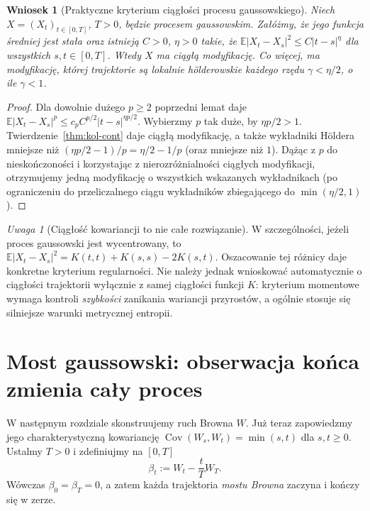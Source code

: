 \documentclass[11pt,a4paper,oneside]{report}
\numberwithin{equation}{chapter}
\theoremstyle{plain}
\newtheorem{wniosek}[twierdzenie]{Wniosek}
\theoremstyle{definition}
\theoremstyle{remark}
\newtheorem{uwaga}{Uwaga}[chapter]
\newcommand{\E}{\mathbb{E}}
\newcommand{\Cov}{\operatorname{Cov}}
\begin{document}
\begin{wniosek}[Praktyczne kryterium ciągłości procesu gaussowskiego]
Niech $X=(X_t)_{t\in[0,T]}$, $T>0$, będzie procesem gaussowskim.
Załóżmy, że jego funkcja średniej jest stała oraz istnieją
$C>0$, $\eta>0$ takie, że
$\E|X_t-X_s|^2\le C|t-s|^{\eta}$ dla wszystkich $s,t\in[0,T]$.
Wtedy $X$ ma ciągłą modyfikację. Co więcej, ma modyfikację,
której trajektorie są lokalnie h\"olderowskie każdego rzędu
$\gamma<\eta/2$, o ile $\gamma<1$.
\end{wniosek}
\begin{proof}
Dla dowolnie dużego $p\ge2$ poprzedni lemat daje
$\E|X_t-X_s|^p\le c_p C^{p/2}|t-s|^{\eta p/2}$.
Wybierzmy $p$ tak duże, by $\eta p/2>1$.
Twierdzenie~\ref{thm:kol-cont} daje ciągłą modyfikację,
a także wykładniki H\"oldera mniejsze niż
$(\eta p/2-1)/p=\eta/2-1/p$ (oraz mniejsze niż $1$).
Dążąc z $p$ do nieskończoności i korzystając z
nierozróżnialności ciągłych modyfikacji, otrzymujemy
jedną modyfikację o wszystkich wskazanych wykładnikach
(po ograniczeniu do przeliczalnego ciągu wykładników
zbiegającego do $\min(\eta/2,1)$).
\end{proof}

\begin{uwaga}[Ciągłość kowariancji to nie całe rozwiązanie]
W szczególności, jeżeli proces gaussowski jest wycentrowany,
to $\E|X_t-X_s|^2=K(t,t)+K(s,s)-2K(s,t)$.
Oszacowanie tej różnicy daje konkretne kryterium regularności.
Nie należy jednak wnioskować automatycznie o ciągłości
trajektorii wyłącznie z samej ciągłości funkcji $K$:
kryterium momentowe wymaga kontroli \emph{szybkości}
zanikania wariancji przyrostów, a ogólnie stosuje się
silniejsze warunki metrycznej entropii.
\end{uwaga}

\section{Most gaussowski: obserwacja końca zmienia cały proces}
W następnym rozdziale skonstruujemy ruch Browna $W$.
Już teraz zapowiedzmy jego charakterystyczną kowariancję
$\Cov(W_s,W_t)=\min(s,t)$ dla $s,t\ge0$.
Ustalmy $T>0$ i zdefiniujmy na $[0,T]$
\[
\beta_t:=W_t-\frac{t}{T}W_T.
\]
Wówczas $\beta_0=\beta_T=0$, a zatem każda trajektoria
\emph{mostu Browna} zaczyna i kończy się w zerze.
\end{document}
